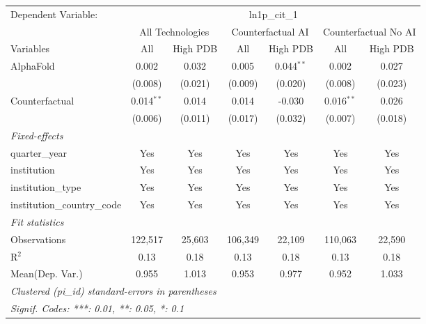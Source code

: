 \begingroup
\centering
\begin{tabular}{lcccccc}
   \tabularnewline \midrule \midrule
   Dependent Variable: & \multicolumn{6}{c}{ln1p\_cit\_1}\\
 & \multicolumn{2}{c}{All Technologies} & \multicolumn{2}{c}{Counterfactual AI} & \multicolumn{2}{c}{Counterfactual No AI} \\
\cmidrule(lr){1-1}\cmidrule(lr){2-3} \cmidrule(lr){4-5} \cmidrule(lr){6-7}
Variables & \multicolumn{1}{c}{All} & \multicolumn{1}{c}{High PDB} & \multicolumn{1}{c}{All} & \multicolumn{1}{c}{High PDB} & \multicolumn{1}{c}{All} & \multicolumn{1}{c}{High PDB} \\
\cmidrule(lr){1-1}\cmidrule(lr){2-2} \cmidrule(lr){3-3} \cmidrule(lr){4-4} \cmidrule(lr){5-5} \cmidrule(lr){6-6} \cmidrule(lr){7-7}
   AlphaFold                    & 0.002        & 0.032   & 0.005   & 0.044$^{**}$ & 0.002        & 0.027\\   
                                & (0.008)      & (0.021) & (0.009) & (0.020)      & (0.008)      & (0.023)\\   
   Counterfactual               & 0.014$^{**}$ & 0.014   & 0.014   & -0.030       & 0.016$^{**}$ & 0.026\\   
                                & (0.006)      & (0.011) & (0.017) & (0.032)      & (0.007)      & (0.018)\\   
   \midrule
   \emph{Fixed-effects}\\
   quarter\_year                & Yes          & Yes     & Yes     & Yes          & Yes          & Yes\\  
   institution                  & Yes          & Yes     & Yes     & Yes          & Yes          & Yes\\  
   institution\_type            & Yes          & Yes     & Yes     & Yes          & Yes          & Yes\\  
   institution\_country\_code   & Yes          & Yes     & Yes     & Yes          & Yes          & Yes\\  
   \midrule
   \emph{Fit statistics}\\
   Observations                 & 122,517      & 25,603  & 106,349 & 22,109       & 110,063      & 22,590\\  
   R$^2$                        & 0.13         & 0.18    & 0.13    & 0.18         & 0.13         & 0.18\\  
Mean(Dep. Var.) & 0.955 & 1.013 & 0.953 & 0.977 & 0.952 & 1.033 \\
   \midrule \midrule
   \multicolumn{7}{l}{\emph{Clustered (pi\_id) standard-errors in parentheses}}\\
   \multicolumn{7}{l}{\emph{Signif. Codes: ***: 0.01, **: 0.05, *: 0.1}}\\
\end{tabular}
\par\endgroup
